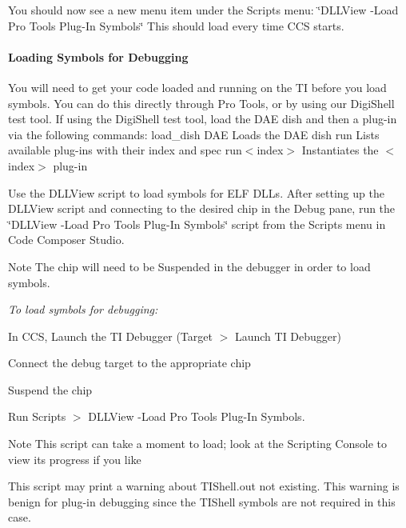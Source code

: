 You should now see a new menu item under the Scripts menu\+: \char`\"{}\+D\+L\+L\+View -\/\+Load Pro Tools Plug-\/\+In Symbols\char`\"{} This should load every time C\+C\+S starts.

\hypertarget{a00362_subsubsection__loading_symbols_for_debugging_}{}\paragraph{Loading Symbols for Debugging}\label{a00362_subsubsection__loading_symbols_for_debugging_}
 You will need to get your code loaded and running on the T\+I before you load symbols. You can do this directly through Pro Tools, or by using our Digi\+Shell test tool. If using the Digi\+Shell test tool, load the D\+A\+E dish and then a plug-\/in via the following commands\+:  {\ttfamily load\+\_\+dish D\+A\+E}   Loads the D\+A\+E dish  {\ttfamily run }  Lists available plug-\/ins with their index and spec  {\ttfamily run$<$index$>$}   Instantiates the $<$index$>$ plug-\/in

Use the D\+L\+L\+View script to load symbols for E\+L\+F D\+L\+Ls. After setting up the D\+L\+L\+View script and connecting to the desired chip in the Debug pane, run the \char`\"{}\+D\+L\+L\+View -\/\+Load Pro Tools Plug-\/\+In Symbols\char`\"{} script from the Scripts menu in Code Composer Studio.

\begin{DoxyNote}{Note}
The chip will need to be Suspended in the debugger in order to load symbols.
\end{DoxyNote}
{\itshape  To load symbols for debugging\+:} 
\begin{DoxyEnumerate}
\item In C\+C\+S, Launch the T\+I Debugger (Target $>$ Launch T\+I Debugger)  
\item Connect the debug target to the appropriate chip 
\item Suspend the chip  
\item Run Scripts $>$ D\+L\+L\+View -\/\+Load Pro Tools Plug-\/\+In Symbols. \begin{DoxyNote}{Note}
This script can take a moment to load; look at the Scripting Console to view its progress if you like 

This script may print a warning about T\+I\+Shell.\+out not existing. This warning is benign for plug-\/in debugging since the T\+I\+Shell symbols are not required in this case.  
\end{DoxyNote}

\end{DoxyEnumerate}

